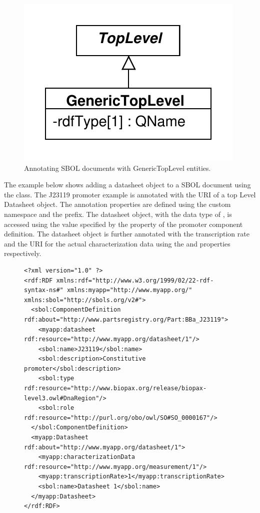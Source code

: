 \begin{figure}[ht]
\begin{center}
\includegraphics[scale=0.6]{uml/generictoplevel}
\caption[]{Annotating SBOL documents with GenericTopLevel entities.}
\label{uml:generictoplevel}
\end{center}
\end{figure}

The example below shows adding a datasheet object to a SBOL document using the  class. The J23119 promoter example is annotated with the URI of a top Level Datasheet object. The annotation properties are defined using the custom  namespace and the  prefix. The datasheet object, with the data type of , is accessed using the  value specified by the  property of the promoter component definition. The datasheet object is further annotated with the transcription rate and the URI for the actual characterization data using the  and  properties respectively.

\begin{figure}[ht]
\begin{lstlisting}
<?xml version="1.0" ?>
<rdf:RDF xmlns:rdf="http://www.w3.org/1999/02/22-rdf-syntax-ns#" xmlns:myapp="http://www.myapp.org/" xmlns:sbol="http://sbols.org/v2#">
  <sbol:ComponentDefinition rdf:about="http://www.partsregistry.org/Part:BBa_J23119">
    <myapp:datasheet rdf:resource="http://www.myapp.org/datasheet/1"/>
    <sbol:name>J23119</sbol:name>
    <sbol:description>Constitutive promoter</sbol:description>
    <sbol:type rdf:resource="http://www.biopax.org/release/biopax-level3.owl#DnaRegion"/>
    <sbol:role rdf:resource="http://purl.org/obo/owl/SO#SO_0000167"/>
  </sbol:ComponentDefinition>
  <myapp:Datasheet rdf:about="http://www.myapp.org/datasheet/1">
    <myapp:characterizationData rdf:resource="http://www.myapp.org/measurement/1"/>
    <myapp:transcriptionRate>1</myapp:transcriptionRate>
    <sbol:name>Datasheet 1</sbol:name>
  </myapp:Datasheet>
</rdf:RDF>

\end{lstlisting}
\label{ser:GenericTopLevel}
\end{figure}